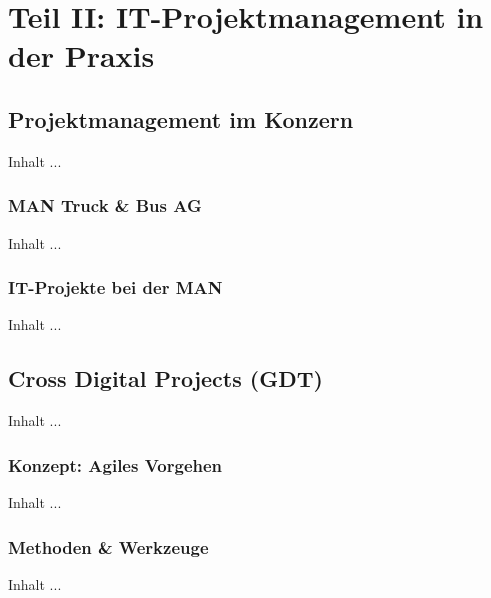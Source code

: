 
\chapter{Teil II: IT-Projektmanagement in der Praxis}
\minitoc 


\section{Projektmanagement im Konzern}
Inhalt ...

\subsection{MAN Truck \& Bus AG}
Inhalt ...

\subsection{IT-Projekte bei der MAN}
Inhalt ...


\section{Cross Digital Projects (GDT)}
Inhalt ...

\subsection{Konzept: Agiles Vorgehen}
Inhalt ...

\subsection{Methoden & Werkzeuge}
Inhalt ...
